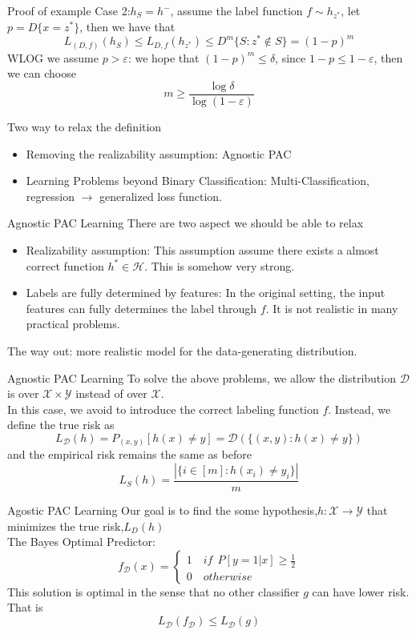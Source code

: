 \documentclass{beamer}
\begin{document}
\begin{frame}{Proof of example}
	Case 2:$h_S = h^{-}$, assume the label function $f \sim h_{z^*}$, let $p = D\{x = z^*\}$, then we have that 
	\[L_{(D,f)} (h_S) \leq L_{D,f} (h_{z^*}) \leq D^{m}\{S: z^* \notin S\} = (1-p)^m\]
	WLOG we assume $p > \varepsilon$: we hope that $(1-p)^m \leq \delta$, since $1-p \leq 1- \varepsilon$, then we can choose 
	\[m \geq \frac{\log \delta}{\log(1-\varepsilon)}\]
\end{frame}
\begin{frame}{Two way to relax the definition}
	\begin{itemize}
			\item Removing the realizability assumption: Agnostic PAC
			\item Learning Problems beyond Binary Classification: Multi-Classification, regression $\rightarrow$ generalized loss function.
	\end{itemize}

\end{frame}
\begin{frame}{Agnostic PAC Learning}
	There are two aspect we should be able to relax
	\begin{itemize}
		\item Realizability assumption: This assumption assume there exists a almost correct function $h^* \in \mathcal{H}$. This is somehow very strong. 
		\item Labels are fully determined by features: In the original setting, the input features can fully determines the label through $f$. It is not realistic in many practical problems.
	\end{itemize}
	The way out: more realistic model for the data-generating distribution. 

\end{frame}
\begin{frame}{Agnostic PAC Learning}
	To solve the above problems, we allow the distribution $\mathcal{D}$ is over $\mathcal{X} \times \mathcal{Y} $ instead of over $\mathcal{X}$. \\
	In this case, we avoid to introduce the correct labeling function $f$. Instead, we define the true risk as 
	\[L_{\mathcal{D}}(h) = P_{(x,y)} [h(x) \neq  y] = \mathcal{D} (\{(x,y):h(x) \neq y\})\]
	and the empirical risk remains the same as before
\[L_S(h) = \frac{|\{i \in [m]:h(x_i) \neq y_i\}|}{m}\]
\end{frame}
\begin{frame}{Agostic PAC Learning}
	Our goal is to find the some hypothesis,$h: \mathcal{X} \rightarrow \mathcal{Y}$ that minimizes the true risk,$L_D(h)$ \\
	The Bayes Optimal Predictor:
	\[f_{\mathcal{D}} (x) = \begin{cases}
			1 \quad if \ \ P[y=1|x] \geq \frac{1}{2} \\
			0 \quad otherwise
		\end{cases}
		\]
	This solution is optimal in the sense that no other classifier $g$ can have lower risk. That is 
	\[L_{\mathcal{D}} (f_{\mathcal{D}}) \leq L_{\mathcal{D}} (g)\]
\end{frame}
\end{document}
